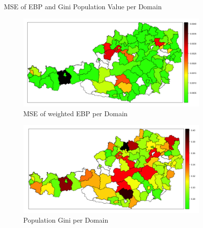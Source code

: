 \documentclass[fleqn,final]{beamer}
\newcommand{\Pheight}{\rule[-5mm]{0cm}{1cm}}
\begin{document}
\begin{frame}
\begin{columns}[t]
\begin{column}{.3\linewidth}
\begin{block}{MSE of EBP and Gini Population Value per Domain \Pheight}
\begin{center}
	\begin{figure}
		\includegraphics[width=0.9\textwidth]{EBPWeightedMSE}
		\caption{MSE of weighted EBP per Domain}
	\end{figure}
		\begin{figure}
		\includegraphics[width=0.9\textwidth]{EBPWeightedPopulationValue}
		\caption{Population Gini per Domain}
	\end{figure}
\end{center}

\end{block}

\end{column}

%

\begin{column}{.3\linewidth}


\end{column}
\end{columns}
\end{frame}
\end{document}
